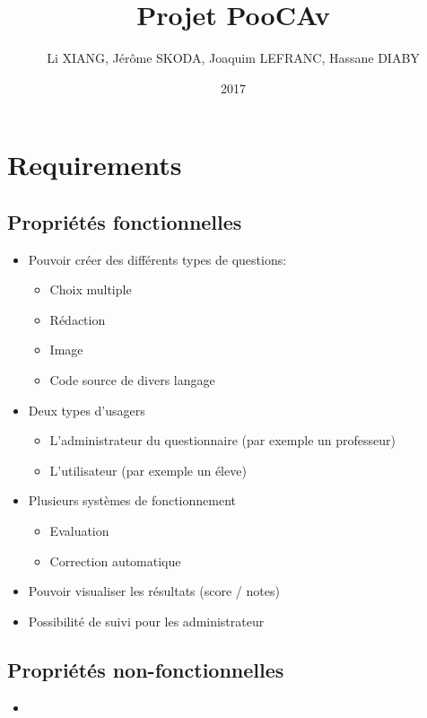 \documentclass[12pt]{article}
\title{Projet PooCAv}
\author{Li XIANG, Jérôme SKODA, Joaquim LEFRANC, Hassane DIABY}
\date{2017}
\begin{document}
\maketitle
\section{Requirements}

\subsection{Propriétés fonctionnelles}
\begin{itemize}
  \item Pouvoir créer des différents types de questions:
    \begin{itemize}
      \item Choix multiple
      \item Rédaction
      \item Image
      \item Code source de divers langage
    \end{itemize}
  \item Deux types d'usagers
    \begin{itemize}
      \item L'administrateur du questionnaire (par exemple un professeur)
      \item L'utilisateur (par exemple un éleve)
    \end{itemize}
  \item Plusieurs systèmes de fonctionnement
    \begin{itemize}
      \item Evaluation
      \item Correction automatique
    \end{itemize}
  \item Pouvoir visualiser les résultats (score / notes)
  \item Possibilité de suivi pour les administrateur
\end{itemize}

\subsection{Propriétés non-fonctionnelles}
\begin{itemize}
  \item

\end{itemize}
\end{document}
